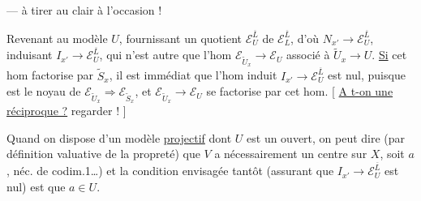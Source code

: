 --- à tirer au clair à l'occasion !

Revenant au modèle $U$, fournissant
un quotient $\mathcal E_U^{\overline L}$ de $\mathcal E_L^{\overline L}$, d'où
$N_{x'}\longrightarrow\mathcal E_U^{\overline L}$, induisant $I_{x'}\longrightarrow\mathcal E_U^{\overline L}$,
qui n'est autre que l'hom \unsure{---} $\mathcal E_{\widetilde U_x}\longrightarrow\mathcal E_U$
associé à $\widetilde U_x\longrightarrow U$. \uline{Si} cet hom
factorise par $\widetilde S_x$, il est immédiat
que l'hom induit $I_{x'}\longrightarrow\mathcal E_U^{\overline L}$ est
nul, puisque  est le noyau de
$\mathcal E_{\widetilde U_x}\Longrightarrow\mathcal E_{\widetilde S_x}$, et $\mathcal E_{\widetilde U_x}\longrightarrow\mathcal E_U$ se factorise par
cet hom.
[ \uline{A t-on une réciproque ?} regarder ! ]

Quand on dispose d'un
modèle \uline{projectif} dont $U$ est un ouvert,
on peut dire (par définition valuative de
la propreté) que $V$ a nécessairement
un centre sur $X$, soit $a$,  
néc. de codim.1\ldots) et la condition
envisagée tantôt (assurant que $I_{x'}\longrightarrow
\mathcal E_U^{\overline L}$ est nul) est que $a\in U$.
